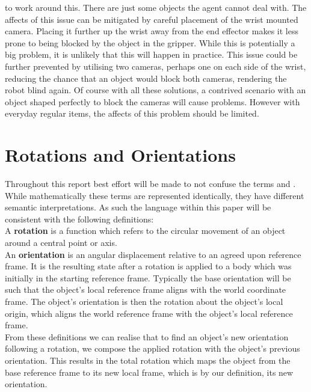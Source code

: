 to work around this. There are just some objects the agent cannot deal with. The affects of this issue can be mitigated by careful placement of the wrist mounted camera. Placing it further up the wrist away from the end effector makes it less prone to being blocked by the object in the gripper. While this is potentially a big problem, it is unlikely that this will happen in practice. This issue could be further prevented by utilising two cameras, perhaps one on each side of the wrist, reducing the chance that an object would block both cameras, rendering the robot blind again. Of course with all these solutions, a contrived scenario with an object shaped perfectly to block the cameras will cause problems. However with everyday regular items, the affects of this problem should be limited.

\section{Rotations and Orientations}
\label{sec:rotations}
Throughout this report best effort will be made to not confuse the terms  and . While mathematically these terms are represented identically, they have different semantic interpretations. As such the language within this paper will be consistent with the following definitions:\\
A \textbf{rotation} is a function which refers to the circular movement of an object around a central point or axis.\\ %
An \textbf{orientation} is an angular displacement relative to an agreed upon reference frame. It is the resulting state after a rotation is applied to a body which was initially in the starting reference frame. Typically the base orientation will be such that the object's local reference frame aligns with the world coordinate frame. The object's orientation is then the rotation about the object's local origin, which aligns the world reference frame with the object's local reference frame.\\

From these definitions we can realise that to find an object's new orientation following a rotation, we compose the applied rotation with the object's previous orientation. This results in the total rotation which maps the object from the base reference frame to its new local frame, which is by our definition, its new orientation.\\


